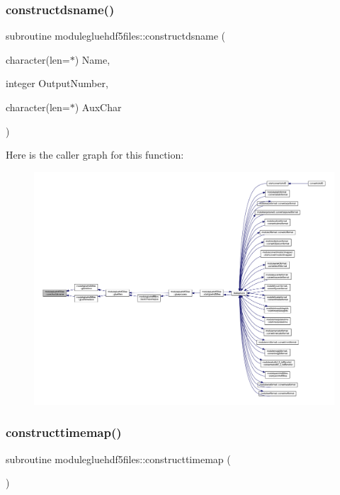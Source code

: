 \subsubsection{\texorpdfstring{constructdsname()}{constructdsname()}}
{\footnotesize\ttfamily subroutine modulegluehdf5files\+::constructdsname (\begin{DoxyParamCaption}\item[{character(len=$\ast$)}]{Name,  }\item[{integer}]{Output\+Number,  }\item[{character(len=$\ast$)}]{Aux\+Char }\end{DoxyParamCaption})\hspace{0.3cm}{\ttfamily [private]}}

Here is the caller graph for this function\+:\nopagebreak
\begin{figure}[H]
\begin{center}
\leavevmode
\includegraphics[width=350pt]{namespacemodulegluehdf5files_a50f42179c2c16aa6c290cd9672da239b_icgraph}
\end{center}
\end{figure}
\mbox{\label{namespacemodulegluehdf5files_a30ae163f5236c7c84af5e6fd552d3da1}} 
\subsubsection{\texorpdfstring{constructtimemap()}{constructtimemap()}}
{\footnotesize\ttfamily subroutine modulegluehdf5files\+::constructtimemap (\begin{DoxyParamCaption}{ }\end{DoxyParamCaption})\hspace{0.3cm}{\ttfamily [private]}}

